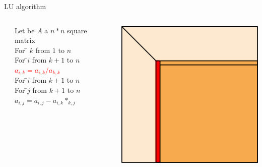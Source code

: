 \begin{frame}{LU algorithm}
\begin{columns}[c]
\begin{column}{0.02\textwidth}
\end{column}
\begin{column}{0.60\textwidth}
\begin{tabbing}
Let be $A$ a $n*n$ square matrix\\
For \= $k$ from $1$ to $n$\\
\> For \=$i$ from $k+1$ to $n$\\
\>\> \textcolor{red}{$a_{i,k} = a_{i,k}/a_{k,k}$}\\
\> For \=$i$ from $k+1$ to $n$\\
\>\> For \=$j$ from $k+1$ to $n$\\
\>\>\> \textcolor{borange}{$a_{i,j} = a_{i,j}-a_{i,k}*_{k,j}$}\\
\end{tabbing}
\end{column}
\begin{column}{0.02\textwidth}
\end{column}
\begin{column}{0.35\textwidth}
\includegraphics[width=0.8\linewidth]{linpack}
\end{column}
\end{columns}
\end{frame}

